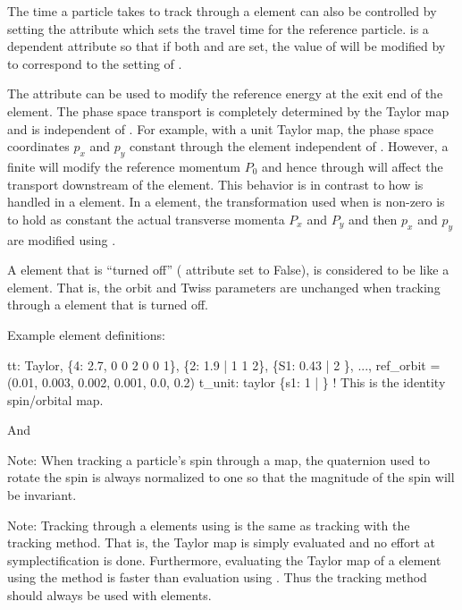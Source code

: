 {The time a particle takes to track through a  element can also be controlled by setting
the  attribute which sets the travel time for the reference
particle.  is a dependent attribute so that if both  and
 are set, the value of  will be modified by \bmad to
correspond to the setting of .

The  attribute can be used to modify the reference energy at the exit end of the
 element. The phase space transport is completely determined by the Taylor map and is
independent of . For example, with a unit Taylor map, the phase space coordinates
$p_x$ and $p_y$ constant through the element independent of . However, a finite
 will modify the reference momentum $P_0$ and hence through  will affect the
transport downstream of the  element. This behavior is in contrast to how
 is handled in a  element. In a  element, the transformation
used when  is non-zero is to hold as constant the actual transverse momenta $P_x$
and $P_y$ and then $p_x$ and $p_y$ are modified using .

A  element that is ``turned off'' ( attribute set to False), is
considered to be like a  element. That is, the orbit and Twiss parameters are
unchanged when tracking through a  element that is turned off.

Example  element definitions:
\begin{example}
  tt: Taylor, \{4:  2.7, 0 0 2 0 0 1\}, \{2:  1.9 | 1 1 2\},
              \{S1: 0.43 | 2 \}, ..., 
              ref_orbit = (0.01, 0.003, 0.002, 0.001, 0.0, 0.2)
  t_unit: taylor \{s1: 1 | \}  ! This is the identity spin/orbital map.
\end{example}
And 

Note: When tracking a particle's spin through a map, the quaternion used to rotate the spin is
always normalized to one so that the magnitude of the spin will be invariant. 

Note: Tracking through a  elements using  is the same as
tracking with the  tracking method.  That is, the Taylor map is simply
evaluated and no effort at symplectification is done. Furthermore, evaluating the Taylor
map of a  element using the  method is faster than evaluation using
. Thus the  tracking method should always be used with
 elements.


}
